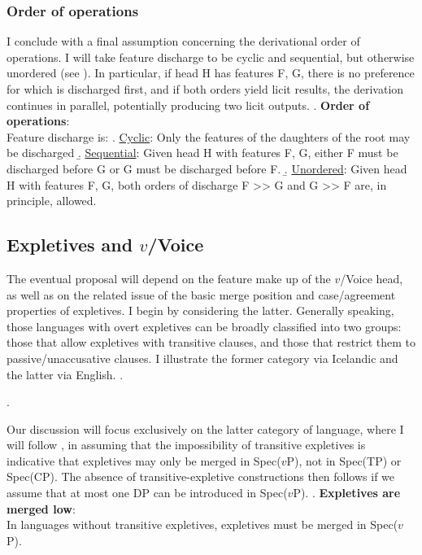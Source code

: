 \documentclass[11pt, letterpaper]{paper_nick}
\begin{document}
\subsubsection{Order of operations}
I conclude with a final assumption concerning the derivational order of operations. I will take feature discharge to be cyclic and sequential, but otherwise unordered (see \Next). In particular, if head H has features F, G, there is no preference for which is discharged first, and if both orders yield licit results, the derivation continues in parallel, potentially producing two licit outputs. 
\ex. \textbf{Order of operations}:\\
Feature discharge is:
\a. \underline{Cyclic}: Only the features of the daughters of the root may be discharged
\b. \underline{Sequential}: Given head H with features F, G, either F must be discharged before G or G must be discharged before F.
\b. \underline{Unordered}: Given head H with features F, G, both orders of discharge F >> G and G >> F are, in principle, allowed.

\subsection{Expletives and $v$/Voice}
The eventual proposal will depend on the feature make up of the $v$/Voice head, as well as on the related issue of the basic merge position and case/agreement properties of expletives. I begin by considering the latter. Generally speaking, those languages with overt expletives can be broadly classified into two groups: those that allow expletives with transitive clauses, and those that restrict them to passive/unaccusative clauses. I illustrate the former category via Icelandic and the latter via English.
\ex. 

\ex.

Our discussion will focus exclusively on the latter category of language, where I will follow \citet{richards05}, \citet{deal09} in assuming that the impossibility of transitive expletives is indicative that expletives may only be merged in Spec($v$P), not in Spec(TP) or Spec(CP). The absence of transitive-expletive constructions then follows if we assume that at most one DP can be introduced in Spec($v$P).
\ex.\label{low-merge} \textbf{Expletives are merged low}:\\
In languages without transitive expletives, expletives must be merged in Spec($v$P).
\end{document}

